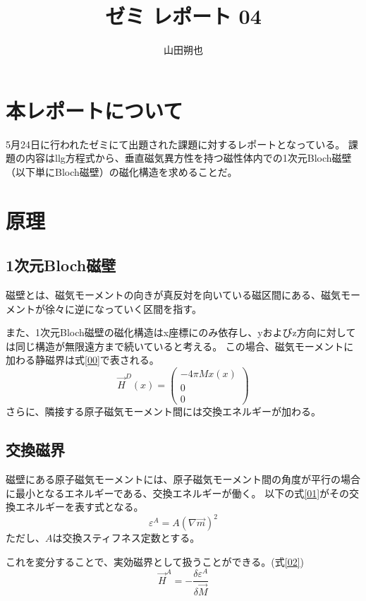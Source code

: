 \documentclass{jsarticle}
\begin{document}
\title{ゼミ レポート 04}
\author{山田朔也}
\maketitle

\section{本レポートについて}
5月24日に行われたゼミにて出題された課題に対するレポートとなっている。
課題の内容はllg方程式から、垂直磁気異方性を持つ磁性体内での1次元Bloch磁壁（以下単にBloch磁壁）の磁化構造を求めることだ。

\section{原理}
\subsection{1次元Bloch磁壁}
磁壁とは、磁気モーメントの向きが真反対を向いている磁区間にある、磁気モーメントが徐々に逆になっていく区間を指す。

また、1次元Bloch磁壁の磁化構造はx座標にのみ依存し、yおよびz方向に対しては同じ構造が無限遠方まで続いていると考える。
この場合、磁気モーメントに加わる静磁界は式\ref{00}で表される。
\begin{equation}
	\vec{H}^D (x) = 
	\begin{pmatrix}
		-4\pi Mx(x)\\
		0\\
		0
	\end{pmatrix}
	\label{00}
\end{equation}
さらに、隣接する原子磁気モーメント間には交換エネルギーが加わる。


\subsection{交換磁界}
磁壁にある原子磁気モーメントには、原子磁気モーメント間の角度が平行の場合に最小となるエネルギーである、交換エネルギーが働く。
以下の式\ref{01}がその交換エネルギーを表す式となる。
\begin{equation}
	\label{01}
	\varepsilon^A = A(\nabla \vec{m})^2
\end{equation}
ただし、$A$は交換スティフネス定数とする。

これを変分することで、実効磁界として扱うことができる。(式\ref{02})
\begin{equation}
	\label{02}
	\vec{H}^A = -\frac{\delta \varepsilon^A}{\delta \vec{M}}
\end{equation}
\end{document}

